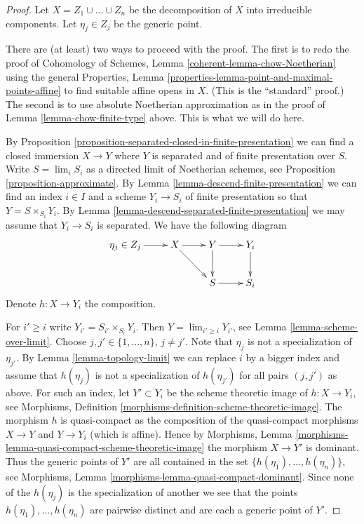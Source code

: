 \documentclass{stacks-project}
\theoremstyle{plain}
\theoremstyle{definition}
\theoremstyle{remark}
\numberwithin{equation}{subsection}
\def\lim{\mathop{\mathrm{lim}}\nolimits}
\begin{document}
\begin{proof}
Let $X = Z_1 \cup \ldots \cup Z_n$ be the decomposition of $X$
into irreducible components. Let $\eta_j \in Z_j$ be the generic point.

\medskip\noindent
There are (at least) two ways to proceed with the proof.
The first is to redo the proof of
Cohomology of Schemes, Lemma \ref{coherent-lemma-chow-Noetherian}
using the general
Properties, Lemma \ref{properties-lemma-point-and-maximal-points-affine}
to find suitable affine opens in $X$. (This is the ``standard'' proof.)
The second is to use absolute Noetherian approximation as in
the proof of Lemma \ref{lemma-chow-finite-type} above.
This is what we will do here.

\medskip\noindent
By Proposition \ref{proposition-separated-closed-in-finite-presentation}
we can find a closed immersion $X \to Y$ where $Y$ is separated
and of finite presentation over $S$.
Write $S = \lim_i S_i$ as a directed limit of Noetherian schemes, see
Proposition \ref{proposition-approximate}. By
Lemma \ref{lemma-descend-finite-presentation} we can
find an index $i \in I$ and a scheme $Y_i \to S_i$ of finite presentation
so that $Y = S \times_{S_i} Y_i$.
By Lemma \ref{lemma-descend-separated-finite-presentation}
we may assume that $Y_i \to S_i$ is separated.
We have the following diagram
$$
\xymatrix{
\eta_j \in Z_j \ar[r] & X \ar[r] \ar[rd] & Y \ar[r] \ar[d] & Y_i \ar[d] \\
& & S \ar[r] & S_i
}
$$
Denote $h : X \to Y_i$ the composition.

\medskip\noindent
For $i' \geq i$ write $Y_{i'} = S_{i'} \times_{S_i} Y_i$.
Then $Y = \lim_{i' \geq i} Y_{i'}$, see
Lemma \ref{lemma-scheme-over-limit}.
Choose $j, j' \in \{1, \ldots, n\}$, $j \not = j'$.
Note that $\eta_j$ is not a specialization of $\eta_{j'}$.
By Lemma \ref{lemma-topology-limit}
we can replace $i$ by a bigger index and assume
that $h(\eta_j)$ is not a specialization of $h(\eta_{j'})$
for all pairs $(j, j')$ as above.
For such an index, let
$Y' \subset Y_i$ be the scheme theoretic image of
$h : X \to Y_i$, see
Morphisms, Definition \ref{morphisms-definition-scheme-theoretic-image}.
The morphism $h$ is quasi-compact as the composition of the quasi-compact
morphisms $X \to Y$ and $Y \to Y_i$ (which is affine).
Hence by
Morphisms, Lemma \ref{morphisms-lemma-quasi-compact-scheme-theoretic-image}
the morphism $X \to Y'$ is dominant. Thus the generic points
of $Y'$ are all contained in the set
$\{h(\eta_1), \ldots, h(\eta_n)\}$, see
Morphisms, Lemma \ref{morphisms-lemma-quasi-compact-dominant}.
Since none of the $h(\eta_j)$ is the specialization of another
we see that the points $h(\eta_1), \ldots, h(\eta_n)$ are pairwise
distinct and are each a generic point of $Y'$.


\end{proof}
\end{document}
